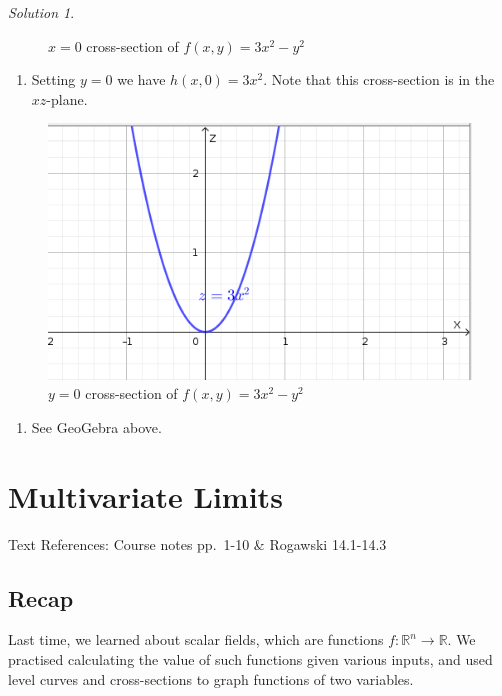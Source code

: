 \documentclass[
]{book}
\providecommand{\tightlist}{%
  \setlength{\itemsep}{0pt}\setlength{\parskip}{0pt}}
\theoremstyle{definition}
\theoremstyle{definition}
\theoremstyle{definition}
\theoremstyle{definition}
\theoremstyle{remark}
\newtheorem*{solution}{Solution}
\begin{document}
\begin{solution}
\begin{figure}
{}

\caption{$x=0$ cross-section of $f(x,y)=3x^2-y^2$}\label{fig:unnamed-chunk-8}
\end{figure}

\begin{enumerate}
\def\labelenumi{\alph{enumi}.}
\setcounter{enumi}{3}
\tightlist
\item
  Setting \(y=0\) we have \(h(x,0)=3x^2\). Note that this cross-section is in the \(xz\)-plane.
\end{enumerate}

\begin{figure}

{\centering \includegraphics[width=0.5\linewidth]{images/y0-h} 

}

\caption{$y=0$ cross-section of $f(x,y)=3x^2-y^2$}\label{fig:unnamed-chunk-9}
\end{figure}

\begin{enumerate}
\def\labelenumi{\alph{enumi}.}
\setcounter{enumi}{4}
\tightlist
\item
  See GeoGebra above.
\end{enumerate}

\end{solution}

\hypertarget{lec-2}{%
\chapter{Multivariate Limits}\label{lec-2}}

Text References: Course notes pp.~1-10 \& Rogawski 14.1-14.3

\hypertarget{recap}{%
\section{Recap}\label{recap}}

Last time, we learned about scalar fields, which are functions \(f:\mathbb{R}^n\to\mathbb{R}\). We practised calculating the value of such functions given various inputs, and used level curves and cross-sections to graph functions of two variables.
\end{document}
